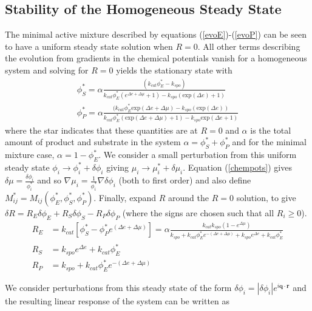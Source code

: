 \subsection{Stability of the Homogeneous Steady State}
The minimal active mixture described by equations (\ref{evoE})-(\ref{evoP}) can be seen to have a uniform steady state solution when $R=0$. All other terms describing the evolution from gradients in the chemical potentials vanish for a homogeneous system and solving for $R=0$ yields the stationary state with
\begin{align}
    \phi_S^* = \alpha\frac{(k_{cat}\phi_E^*-k_{spo})}{k_{cat}\phi_E^*(e^{\Delta e + \Delta\mu}+1) - k_{spo}(\text{exp} (\Delta e)+1)} \label{sstar}
    \\
    \phi_P^* = \alpha\frac{(k_{cat}\phi_E^*\text{exp} (\Delta e + \Delta\mu) - k_{spo}(\text{exp} (\Delta e))}{k_{cat}\phi_E^*(\text{exp} (\Delta e + \Delta\mu)+1) - k_{spo}\text{exp} (\Delta e+1)} 
    \label{pstar}
\end{align}
where the star indicates that these quantities are at $R=0$ and $\alpha$ is the total amount of product and substrate in the system $\alpha = \phi_S^*+\phi_P^*$ and for the minimal mixture case, $\alpha = 1-\phi_E^*$. We consider a small perturbation from this uniform steady state $\phi_i \rightarrow \phi_i^* + \delta\phi_i$ giving $\mu_i \rightarrow \mu_i^* + \delta\mu_i$. Equation (\ref{chempots}) gives $\delta\mu = \frac{\delta\phi_i}{\phi_i^*}$ and so $\nabla\mu_i = \frac{1}{\phi_i^*}\nabla\delta\phi_i$ (both to first order) and also define $M^*_{ij} = M_{ij}(\phi_E^*, \phi_S^*, \phi_P^*)$. Finally, expand $R$ around the $R=0$ solution, to give $\delta R = R_E\delta\phi_E+R_S\delta\phi_S-R_P\delta\phi_P$ (where the signs are chosen such that all $R_i \geq 0$).
\begin{align}
    R_E &= k_{cat}[\phi_S^*-\phi_P^*e^{(\Delta e + \Delta \mu)}] = \alpha\frac{k_{cat}k_{spo}(1-e^{\Delta \mu})}{k_{spo}+k_{cat}\phi_E^*e^{-(\Delta e + \Delta \mu)}+k_{spo}e^{\Delta e}+k_{cat}\phi_E^*}\\
    R_S &= k_{spo}e^{\Delta e} + k_{cat}\phi_E^*\\
    R_P &= k_{spo} + k_{cat}\phi_E^*e^{-(\Delta e+\Delta \mu)}
\end{align}

We consider perturbations from this steady state of the form $\delta\phi_i = |\delta\phi_i| e^{i\textbf{q}\cdot\textbf{r}}$ and the resulting linear response of the system can be written as

